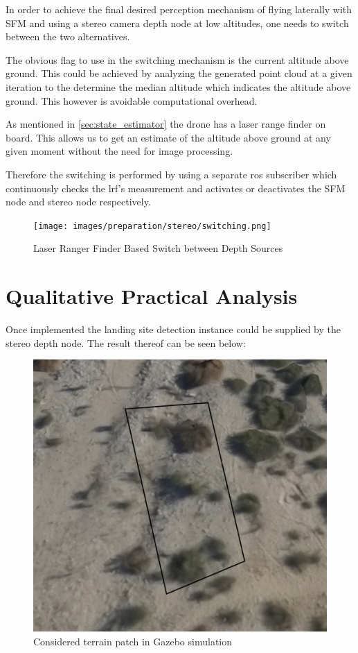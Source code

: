In order to achieve the final desired perception mechanism of flying laterally with SFM and using a stereo camera depth node at low altitudes, one needs to switch between the two alternatives.

The obvious flag to use in the switching mechanism is the current altitude above ground. This could be achieved by analyzing the generated point cloud at a given iteration to the determine the median altitude which indicates the altitude above ground. This however is avoidable computational overhead.

As mentioned in \cref{sec:state_estimator} the drone has a laser range finder on board. This allows us to get an estimate of the altitude above ground at any given moment without the need for image processing.

Therefore the switching is performed by using a separate ros subscriber which continuously checks the lrf's measurement and activates or deactivates the SFM node and stereo node respectively.

\clearpage %
\begin{figure}
    \centering
    \texttt{[image: images/preparation/stereo/switching.png]}
    \caption{Laser Ranger Finder Based Switch between Depth Sources}
\end{figure}

\section{Qualitative Practical Analysis}

Once implemented the landing site detection instance could be supplied by the stereo depth node. The result thereof can be seen below:

\begin{figure}[ht!]
    \centering
    \includegraphics[scale=0.2, angle=-12]{images/preparation/reference_map2.5m_annotated.png}
    \caption{Considered terrain patch in Gazebo simulation}
    \label{stereo_reference}
\end{figure}

